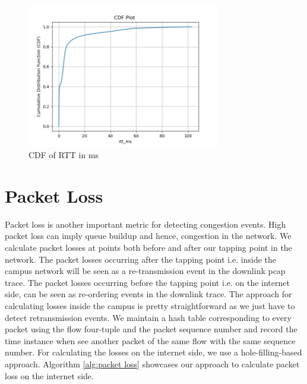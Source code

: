 \begin{figure}[h]
    \centering
        \includegraphics[width=0.75\textwidth]{Figures/rtt_cdf1.png}
    \caption[CDF of RTT in ms]{CDF of RTT in ms}
    \label{fig:rttcdf}
    \bigskip
\end{figure}


\section{Packet Loss}

Packet loss is another important metric for detecting congestion events. High packet loss can imply queue buildup and hence, congestion in the network. We calculate packet losses at points both before and after our tapping point in the network. The packet losses occurring after the tapping point i.e. inside the campus network will be seen as a re-transmission event in the downlink pcap trace. The packet losses occurring before the tapping point i.e. on the internet side, can be seen as re-ordering events in the downlink trace. The approach for calculating losses inside the campus is pretty straightforward as we just have to detect retransmission events. We maintain a hash table corresponding to every packet using the flow four-tuple and the packet sequence number and record the time instance when see another packet of the same flow with the same sequence number. For calculating the losses on the internet side, we use a hole-filling-based approach. Algorithm \ref{alg:packet loss} showcases our approach to calculate packet loss on the internet side.

